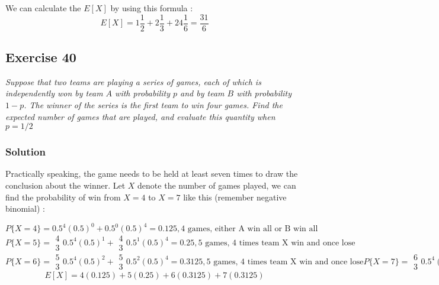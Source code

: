 \documentclass[12pt,a4paper]{article}
\begin{document}
We can calculate the $E[X]$ by using this formula : \[
    E[X] = 1\frac{1}{2} + 2\frac{1}{3} + 24\frac{1}{6} = \frac{31}{6}
\]



\subsection{Exercise 40}

\textit{Suppose that two teams are playing a series of games, each of which is independently won by team $A$ with probability $p$ and by team $B$ with probability $1-p$. The winner of the series is the first team to win four games. Find the expected number of games that are played, and evaluate this quantity when $p=1/2$}

\subsubsection{Solution}
Practically speaking, the game needs to be held at least seven times to draw the conclusion about the winner. Let $X$ denote the number of games played, we can find the probability of win from $X=4$ to $X=7$ like this (remember negative binomial) :

\[
    P\{X = 4\} = 0.5^4(0.5)^0 + 0.5^0(0.5)^4 = 0.125 , \text{4 games, either A win all or B win all}
\]
\[
    P\{X = 5\} = \begin{array}{c}4\\3\end{array}0.5^4(0.5)^1 + \begin{array}{c}4\\3\end{array}0.5^1(0.5)^4 = 0.25  , \text{5 games, 4 times team X win and once lose}
\]
\[
    P\{X = 6\} = \begin{array}{c}5\\3\end{array}0.5^4(0.5)^2 + \begin{array}{c}5\\3\end{array}0.5^2(0.5)^4 = 0.3125  , \text{5 games, 4 times team X win and once lose}

    P\{X = 7\} = \begin{array}{c}6\\3\end{array}0.5^4(0.5)^3 + \begin{array}{c}6\\3\end{array}0.5^3(0.5)^4 = 0.3125  , \text{5 games, 4 times team X win and once lose}
\]
\[
    E[X] = 4(0.125) + 5(0.25) + 6(0.3125)  + 7(0.3125)
\]
\end{document}
